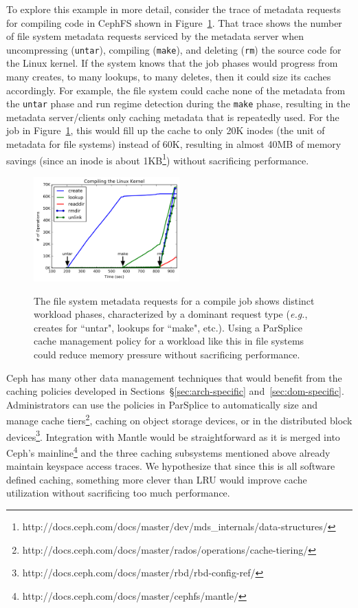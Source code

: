 To explore this example in more detail, consider the trace of metadata requests
for compiling code in CephFS shown in Figure~\ref{fig:compile-ops}.  That trace
shows the number of file system metadata requests serviced by the metadata
server when uncompressing (\texttt{untar}), compiling (\texttt{make}), and
deleting (\texttt{rm}) the source code for the Linux kernel. If the system
knows that the job phases would progress from many creates, to many lookups, to
many deletes, then it could size its caches accordingly. For example, the file
system could cache none of the metadata from the \texttt{untar} phase and run
regime detection during the \texttt{make} phase, resulting in the metadata
server/clients only caching metadata that is repeatedly used. For the job in
Figure~\ref{fig:compile-ops}, this would fill up the cache to only 20K inodes
(the unit of metadata for file systems) instead of 60K, resulting in almost
40MB of memory savings (since an inode is about
1KB\footnote{http://docs.ceph.com/docs/master/dev/mds\_internals/data-structures/})
without sacrificing performance.

\begin{figure}[t]
\noindent\includegraphics[width=0.5\textwidth]{figures/compile-ops.png}\\
\caption{The file system metadata requests for a compile job shows distinct
workload phases, characterized by a dominant request type ({\it e.g.}, creates
for ``untar", lookups for ``make", etc.). Using a ParSplice cache management
policy for a workload like this in file systems could reduce memory pressure
without sacrificing performance.  \label{fig:compile-ops}}
\end{figure}

Ceph has many other data management techniques that would benefit from the
caching policies developed in Sections~\S\ref{sec:arch-specific}
and~\ref{sec:dom-specific}. Administrators can use the policies in ParSplice to
automatically size and manage cache
tiers\footnote{http://docs.ceph.com/docs/master/rados/operations/cache-tiering/},
caching on object storage devices, or in the distributed block
devices\footnote{http://docs.ceph.com/docs/master/rbd/rbd-config-ref/}.
Integration with Mantle would be straightforward as it is merged into Ceph's
mainline\footnote{http://docs.ceph.com/docs/master/cephfs/mantle/} and the
three caching subsystems mentioned above already maintain keyspace access
traces. We hypothesize that since this is all software defined caching,
something more clever than LRU would improve cache utilization without
sacrificing too much performance.

